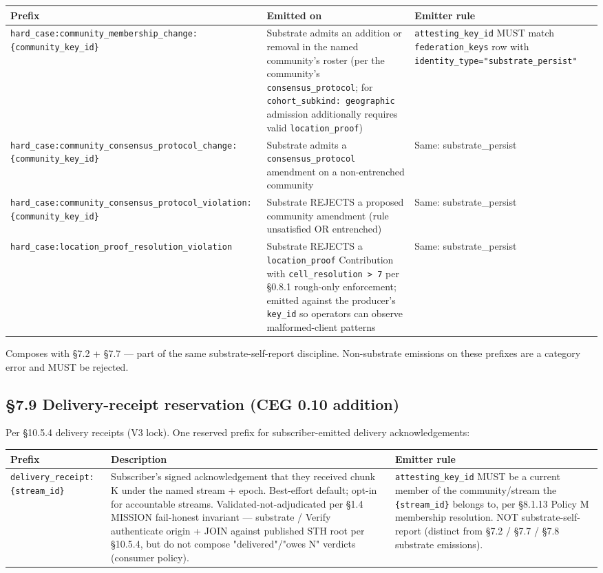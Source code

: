 \documentclass[10pt]{article}
\begin{document}
{\footnotesize
\begin{longtable}{|p{5.33cm}|p{5.33cm}|p{5.33cm}|}\hline
\textbf{Prefix} & \textbf{Emitted on} & \textbf{Emitter rule} \\ \hline\endhead
\texttt{hard\_case:community\_membership\_change:\{community\_key\_id\}} & Substrate admits an addition or removal in the named community's roster (per the community's \texttt{consensus\_protocol}; for \texttt{cohort\_subkind: geographic} admission additionally requires valid \texttt{location\_proof}) & \texttt{attesting\_key\_id} MUST match \texttt{federation\_keys} row with \texttt{identity\_type="substrate\_persist"} \\ \hline
\texttt{hard\_case:community\_consensus\_protocol\_change:\{community\_key\_id\}} & Substrate admits a \texttt{consensus\_protocol} amendment on a non-entrenched community & Same: substrate\_persist \\ \hline
\texttt{hard\_case:community\_consensus\_protocol\_violation:\{community\_key\_id\}} & Substrate REJECTS a proposed community amendment (rule unsatisfied OR entrenched) & Same: substrate\_persist \\ \hline
\texttt{hard\_case:location\_proof\_resolution\_violation} & Substrate REJECTS a \texttt{location\_proof} Contribution with \texttt{cell\_resolution > 7} per §0.8.1 rough-only enforcement; emitted against the producer's \texttt{key\_id} so operators can observe malformed-client patterns & Same: substrate\_persist \\ \hline
\end{longtable}}


Composes with §7.2 + §7.7 — part of the same substrate-self-report discipline. Non-substrate emissions on these prefixes are a category error and MUST be rejected.


\subsection*{§7.9 Delivery-receipt reservation (CEG 0.10 addition)}


Per §10.5.4 delivery receipts (V3 lock). One reserved prefix for subscriber-emitted delivery acknowledgements:


{\footnotesize
\begin{longtable}{|p{5.33cm}|p{5.33cm}|p{5.33cm}|}\hline
\textbf{Prefix} & \textbf{Description} & \textbf{Emitter rule} \\ \hline\endhead
\texttt{delivery\_receipt:\{stream\_id\}} & Subscriber's signed acknowledgement that they received chunk K under the named stream + epoch. Best-effort default; opt-in for accountable streams. Validated-not-adjudicated per §1.4 MISSION fail-honest invariant — substrate / Verify authenticate origin + JOIN against published STH root per §10.5.4, but do not compose "delivered"/"owes N" verdicts (consumer policy). & \texttt{attesting\_key\_id} MUST be a current member of the community/stream the \texttt{\{stream\_id\}} belongs to, per §8.1.13 Policy M membership resolution. NOT substrate-self-report (distinct from §7.2 / §7.7 / §7.8 substrate emissions). \\ \hline
\end{longtable}}
\end{document}
